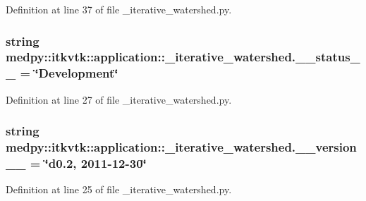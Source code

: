 Definition at line 37 of file \_\-iterative\_\-watershed.py.

\hypertarget{namespacemedpy_1_1itkvtk_1_1application_1_1__iterative__watershed_ab1fe6e799c957d8a6870689070c9da69}{
\subsubsection[{\_\-\_\-status\_\-\_\-}]{\setlength{\rightskip}{0pt plus 5cm}string {\bf medpy::itkvtk::application::\_\-iterative\_\-watershed.\_\-\_\-status\_\-\_\-} = \char`\"{}Development\char`\"{}}}
\label{namespacemedpy_1_1itkvtk_1_1application_1_1__iterative__watershed_ab1fe6e799c957d8a6870689070c9da69}


Definition at line 27 of file \_\-iterative\_\-watershed.py.

\hypertarget{namespacemedpy_1_1itkvtk_1_1application_1_1__iterative__watershed_a1c83959b9e890db3e8d7744132b67de8}{
\subsubsection[{\_\-\_\-version\_\-\_\-}]{\setlength{\rightskip}{0pt plus 5cm}string {\bf medpy::itkvtk::application::\_\-iterative\_\-watershed.\_\-\_\-version\_\-\_\-} = \char`\"{}d0.2, 2011-\/12-\/30\char`\"{}}}
\label{namespacemedpy_1_1itkvtk_1_1application_1_1__iterative__watershed_a1c83959b9e890db3e8d7744132b67de8}


Definition at line 25 of file \_\-iterative\_\-watershed.py.

